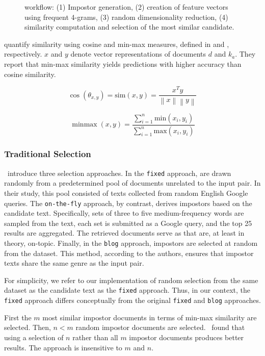 \begin{figure}[htbp]
    \centering
    
    \caption[\impAppr{} workflow]{\impAppr{} workflow: (1) Impostor generation, (2) creation of feature vectors using frequent 4-grams, (3) random dimensionality reduction, (4) similarity computation and selection of the most similar candidate.}
    \label{fig:impostor}
\end{figure}

\citet{koppel_determining_2014} quantify similarity using cosine and min-max measures, defined in  and , respectively. 
$x$ and $y$ denote vector representations of documents $d$ and $k_a$.
They report that min-max similarity yields predictions with higher accuracy than cosine similarity.

\begin{equation}
    \cos(\theta_{x,y})=\mathrm{sim}(x,y)=\frac{x^Ty}{\left\| x \right\|\left\| y \right\|}
    \label{eq:cosine_sim}
\end{equation}

\begin{equation}
    \operatorname{minmax}(x,y)=\frac{\sum_{i=1}^{n}\mathrm{min}(x_i,y_i)}{\sum_{i=1}^{n}\mathrm{max}(x_i,y_i)}
    \label{eq:min_max_sim}
\end{equation}

\subsubsection{Traditional \Imp{} Selection}
\label{subsubsec:traditional_impostor_generation}

\citet{koppel_determining_2014}\ introduce three \imp{} selection approaches. 
In the \texttt{fixed} approach, \imps{} are drawn randomly from a predetermined pool of documents unrelated to the input pair.
In their study, this pool consisted of texts collected from random English Google queries. 
The \texttt{on-the-fly} approach, by contrast, derives impostors based on the candidate text. 
Specifically, sets of three to five medium-frequency words are sampled from the text, each set is submitted as a Google query, and the top 25 results are aggregated. 
The retrieved documents serve as \imps{} that are, at least in theory, on-topic. 
Finally, in the \texttt{blog} approach, impostors are selected at random from the \dataBlog{} dataset. 
This method, according to the authors, ensures that impostor texts share the same genre as the input pair.

For simplicity, we refer to our implementation of random \imp{} selection from the same dataset as the candidate text as the \texttt{fixed} approach. 
Thus, in our context, the \texttt{fixed} approach differs conceptually from the original \texttt{fixed} and \texttt{blog} approaches.

First the $m$ most similar impostor documents in terms of min-max similarity are selected.
Then, $n < m$ random impostor documents are selected.
\citet{koppel_determining_2014}\ found that using a selection of $n$ \imps{} rather than all $m$ impostor documents produces better results.
The approach is insensitive to $m$ and $n$.